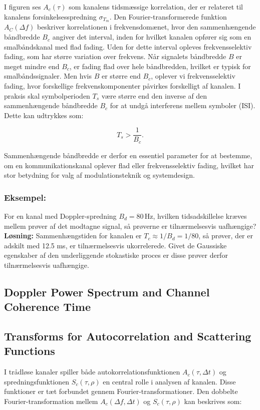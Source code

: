 \documentclass[a4paper,12pt]{book}
\begin{document}
	I figuren ses \( A_c(\tau) \) som kanalens tidsmæssige korrelation, der er relateret til kanalens forsinkelsesspredning \( \sigma_{T_m} \). Den Fourier-transformerede funktion \( A_C(\Delta f) \) beskriver korrelationen i frekvensdomænet, hvor den sammenhængende båndbredde \( B_c \) angiver det interval, inden for hvilket kanalen opfører sig som en smalbåndskanal med flad fading. Uden for dette interval opleves frekvensselektiv fading, som har større variation over frekvens.
	\newline\newline
	Når signalets båndbredde \( B \) er meget mindre end \( B_c \), er fading flad over hele båndbredden, hvilket er typisk for smalbåndssignaler. Men hvis \( B \) er større end \( B_c \), oplever vi frekvensselektiv fading, hvor forskellige frekvenskomponenter påvirkes forskelligt af kanalen.
	\newline\newline
	I praksis skal symbolperioden \( T_s \) være større end den inverse af den sammenhængende båndbredde \( B_c \) for at undgå interferens mellem symboler (ISI). Dette kan udtrykkes som:
	
	\[
	T_s > \frac{1}{B_c}.
	\]
	
	Sammenhængende båndbredde er derfor en essentiel parameter for at bestemme, om en kommunikationskanal oplever flad eller frekvensselektiv fading, hvilket har stor betydning for valg af modulationsteknik og systemdesign.
	
	\subsubsection{Eksempel:}
	For en kanal med Doppler-spredning \( B_d = 80 \, \text{Hz} \), hvilken tidsadskillelse kræves mellem prøver af det modtagne signal, så prøverne er tilnærmelsesvis uafhængige?
	\newline\newline
	\textbf{Løsning:} Sammenhængstiden for kanalen er \( T_c \approx 1 / B_d = 1 / 80 \), så prøver, der er adskilt med 12.5 ms, er tilnærmelsesvis ukorrelerede. Givet de Gaussiske egenskaber af den underliggende stokastiske proces er disse prøver derfor tilnærmelsesvis uafhængige.
	
	\subsection{Doppler Power Spectrum and Channel Coherence Time}
	\subsection*{Transforms for Autocorrelation and Scattering Functions}
	I trådløse kanaler spiller både autokorrelationsfunktionen \( A_c(\tau, \Delta t) \) og spredningsfunktionen \( S_c(\tau, \rho) \) en central rolle i analysen af kanalen. Disse funktioner er tæt forbundet gennem Fourier-transformationer.
	\newline\newline
	Den dobbelte Fourier-transformation mellem \( A_c(\Delta f, \Delta t) \) og \( S_c(\tau, \rho) \) kan beskrives som:
	
\end{document}
